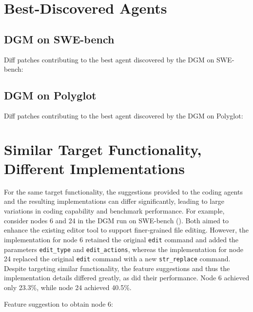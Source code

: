 \documentclass{article}
\begin{document}
\section{Best-Discovered Agents}

\subsection{DGM on SWE-bench}
\label{app:best-agent-dgm}
Diff patches contributing to the best agent discovered by the DGM on SWE-bench:







\subsection{DGM on Polyglot}
\label{app:best-agent-dgm-polyglot}

Diff patches contributing to the best agent discovered by the DGM on Polyglot:





\section{Similar Target Functionality, Different Implementations}
\label{app:supp-dgm-diffimpl}
For the same target functionality, the suggestions provided to the coding agents and the resulting implementations can differ significantly, leading to large variations in coding capability and benchmark performance. For example, consider nodes 6 and 24 in the DGM run on SWE-bench (). Both aimed to enhance the existing editor tool to support finer‑grained file editing. However, the implementation for node 6 retained the original \texttt{edit} command and added the parameters \texttt{edit\_type} and \texttt{edit\_actions}, whereas the implementation for node 24 replaced the original \texttt{edit} command with a new \texttt{str\_replace} command. Despite targeting similar functionality, the feature suggestions and thus the implementation details differed greatly, as did their performance. Node 6 achieved only 23.3\%, while node 24 achieved 40.5\%.

Feature suggestion to obtain node 6:

\end{document}
